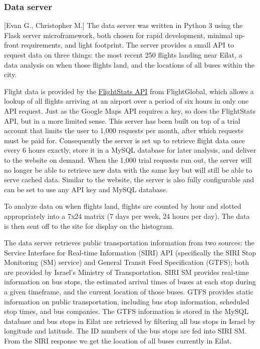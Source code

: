 \documentclass[12pt]{article}                               %
\begin{document}
\subsubsection{Data server}[Evan G., Christopher M.] \label{sec:data_server}
The data server was written in Python 3 using the Flask server microframework, both chosen for rapid development, minimal up-front requirements, and light footprint. The server provides a small API to request data on three things: the most recent 250 flights landing near Eilat, a data analysis on when those flights land, and the locations of all buses within the city.

Flight data is provided by the \href{https://www.flightstats.com/v2/}{FlightStats API} from FlightGlobal, which allows a lookup of all flights arriving at an airport over a period of six hours in only one API request. Just as the Google Maps API requires a key, so does the FlightStats API, but in a more limited sense. This server has been built on top of a trial account that limits the user to 1,000 requests per month, after which requests must be paid for. Consequently the server is set up to retrieve flight data once every 6 hours exactly, store it in a MySQL database for later analysis, and deliver to the website on demand. When the 1,000 trial requests run out, the server will no longer be able to retrieve new data with the same key but will still be able to serve cached data. Similar to the website, the server is also fully configurable and can be set to use any API key and MySQL database.

To analyze data on when flights land, flights are counted by hour and slotted appropriately into a 7x24 matrix (7 days per week, 24 hours per day). The data is then sent off to the site for display on the histogram.

The data server retrieves public transportation information from two sources: the Service Interface for Real-time Information (SIRI) API (specifically the SIRI Stop Monitoring (SM) service) and General Transit Feed Specification (GTFS); both are provided by Israel's Ministry of Transportation. SIRI SM provides real-time information on bus stops, the estimated arrival times of buses at each stop during a given timeframe, and the current location of those buses. GTFS provides static information on public transportation, including bus stop information, scheduled stop times, and bus companies. The GTFS information is stored in the MySQL database and bus stops in Eilat are retrieved by filtering all bus stops in Israel by longitude and latitude. The ID numbers of the bus stops are fed into SIRI SM. From the SIRI response we get the location of all buses currently in Eilat.
\end{document}
